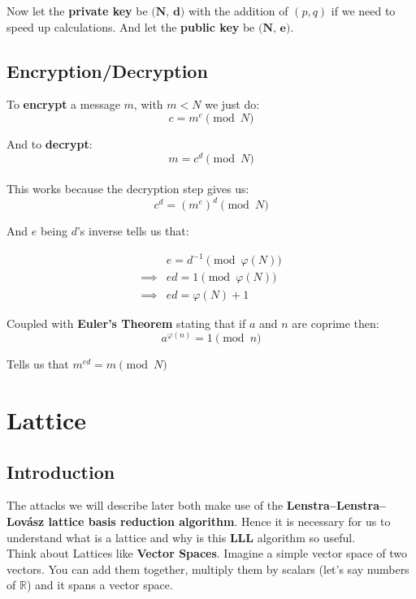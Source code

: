 \documentclass[a4paper,11pt]{article}
\begin{document}
Now let the \textbf{private key} be $\textbf{(N, d)}$ with the addition of $(p, q)$ if we need to speed up calculations.
And let the \textbf{public key} be $\textbf{(N, e)}$.

\subsection{Encryption/Decryption}

To \textbf{encrypt} a message $m$, with $m < N$ we just do:
\[ c = m^e \pmod{N} \]

And to \textbf{decrypt}:
\[ m = c^d \pmod{N} \]\\


This works because the decryption step gives us:
\[ c^d = (m^e)^d \pmod{N} \]

And $e$ being $d$'s inverse tells us that:

\begin{align*}
	&e = d^{-1} \pmod{\varphi(N)} \\
	\implies& ed = 1 \pmod{\varphi(N)} \\
	\implies& ed = \varphi(N) + 1
\end{align*}

Coupled with \textbf{Euler's Theorem} stating that if $a$ and $n$ are coprime then:
\[ a^{\varphi(n)} = 1 \pmod{n} \]

Tells us that $m^{ed} = m \pmod{N}$

\section{Lattice}\label{lattice}

\subsection{Introduction}
The attacks we will describe later both make use of the \textbf{Lenstra–Lenstra–Lovász lattice basis reduction algorithm}. Hence it is necessary for us to understand what is a lattice and why is this \textbf{LLL} algorithm so useful.\\
Think about Lattices like \textbf{Vector Spaces}. Imagine a simple vector space of two vectors. You can add them together, multiply them by scalars (let's say numbers of $\mathbb{R}$) and it spans a vector space.

\\
\end{document}

